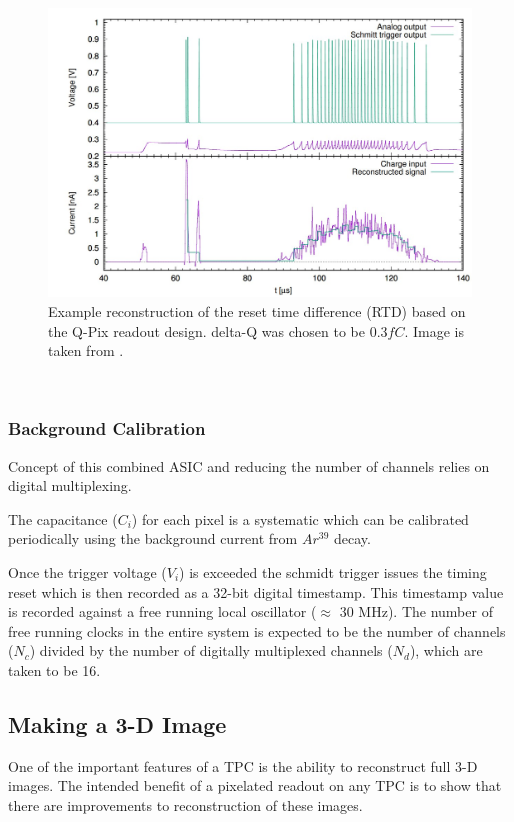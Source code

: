\begin{figure}[]
\centering
\includegraphics[width=\textwidth]{images/qpix_rtd_reconstruction_example_03fc.jpg}
\caption{Example reconstruction of the reset time difference (RTD) based on the Q-Pix readout design. delta-Q was chosen to be $0.3 fC$. Image is taken from \citep{qpix:nygren:mei}.}
\end{figure}
~\label{fig:qpixRecon2}


\subsubsection{Background Calibration}

Concept of this combined ASIC and reducing the number of channels relies on digital multiplexing.

The capacitance ($C_{i}$) for each pixel is a systematic which can be calibrated periodically using the background current from $Ar^{39}$ decay.

Once the trigger voltage ($V_{i}$) is exceeded the schmidt trigger issues the timing reset which is then recorded as a 32-bit digital timestamp.
This timestamp value is recorded against a free running local oscillator ($\approx$ 30 MHz).
The number of free running clocks in the entire system is expected to be the number of channels ($N_{c}$) divided by the number of digitally multiplexed channels ($N_{d}$), which are taken to be 16.

\subsection{Making a 3-D Image}

One of the important features of a TPC is the ability to reconstruct full 3-D images.
The intended benefit of a pixelated readout on any TPC is to show that there are improvements to reconstruction of these images.

